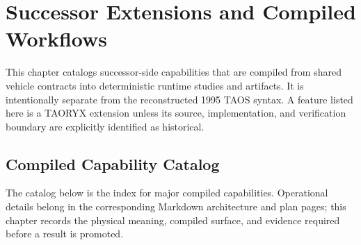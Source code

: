 \chapter{Successor Extensions and Compiled Workflows}\label{chap:extensions}

This chapter catalogs successor-side capabilities that are compiled from
shared vehicle contracts into deterministic runtime studies and artifacts. It
is intentionally separate from the reconstructed 1995 TAOS syntax. A feature
listed here is a TAORYX extension unless its source, implementation, and
verification boundary are explicitly identified as historical.

\section{Compiled Capability Catalog}\label{sec:compiled-capability-catalog}

The catalog below is the index for major compiled capabilities. Operational
details belong in the corresponding Markdown architecture and plan pages; this
chapter records the physical meaning, compiled surface, and evidence required
before a result is promoted.

